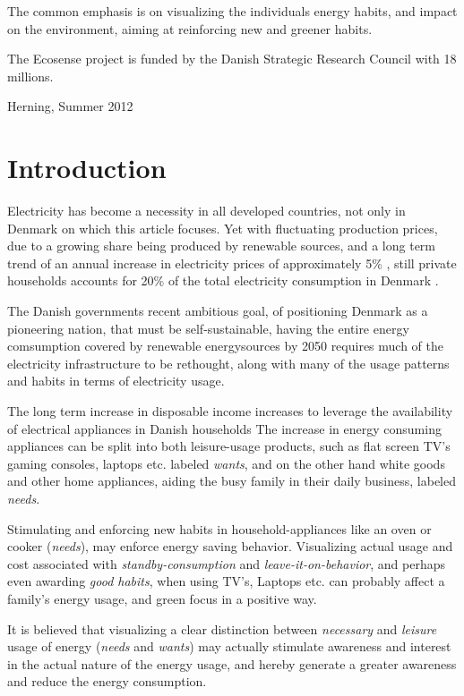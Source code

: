 \documentclass[journal]{IEEEtran}
\begin{document}
The common emphasis is on visualizing the individuals energy habits, and impact on the environment, aiming at reinforcing new and greener habits. 

The Ecosense project is funded by the Danish Strategic Research Council with 18 millions.
 
\hfill Herning, Summer 2012

\section{Introduction}
Electricity has become a necessity in all developed countries, not only in Denmark on which this article focuses. Yet with fluctuating production prices, due to a growing share being produced by renewable sources, and a long term trend of an annual increase in electricity prices of approximately 5\% \cite{udv_elpriser}, still private households accounts for 20\% of the total electricity consumption in Denmark \cite{energistat}.

The Danish governments recent ambitious goal, of positioning Denmark as a pioneering nation, that must be self-sustainable, having the entire energy comsumption covered by renewable energysources by 2050 \cite{energipolitik_2020} requires much of the electricity infrastructure to be rethought, along with many of the usage patterns and habits in terms of electricity usage.


The long term increase in disposable income increases to leverage the availability of electrical appliances in Danish households %
The increase in energy consuming appliances can be split into both leisure-usage products, such as flat screen TV's gaming consoles, laptops etc. labeled \textit{wants}, and on the other hand white goods and other home appliances, aiding the busy family in their daily business, labeled \textit{needs}.

Stimulating and enforcing new habits in household-appliances like an oven or cooker (\textit{needs}), may enforce energy saving behavior. 
Visualizing actual usage and cost associated with \textit{standby-consumption} and \textit{leave-it-on-behavior}, and perhaps even awarding \textit{good habits}, when using TV's, Laptops etc. can probably affect a family's energy usage, and green focus in a positive way.

It is believed that visualizing a clear distinction between \textit{necessary} and \textit{leisure} usage of energy (\textit{needs} and \textit{wants}) may actually stimulate awareness and interest in the actual nature of the energy usage, and hereby generate a greater awareness and reduce the energy consumption.
\end{document}
